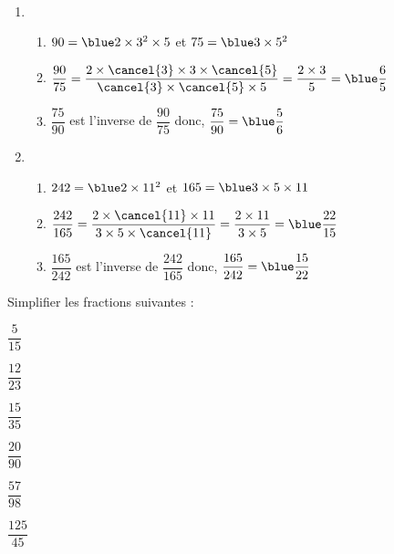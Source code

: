 \begin{colonne*exercice}
\begin{corrige}
\ \\ [-5mm]
   \begin{enumerate}
      \item
         \begin{enumerate}
            \item $90 ={\blue 2\times3^2\times5}$ et $75 ={\blue 3\times5^2}$ \smallskip
            \item $\dfrac{90}{75} =\dfrac{2\times\cancel{3}\times3\times\cancel{5}}{\cancel{3}\times\cancel{5}\times5} =\dfrac{2\times3}{5} ={\blue \dfrac65}$ \smallskip
            \item $\dfrac{75}{90}$ est l'inverse de $\dfrac{90}{75}$ donc, $\dfrac{75}{90}={\blue \dfrac56}$ \smallskip
         \end{enumerate}
      \setcounter{enumi}{1}
      \item          
         \begin{enumerate}
            \item $242 =\blue 2\times11^2$ et $165 =\blue3\times5\times11$ \smallskip
            \item $\dfrac{242}{165} =\dfrac{2\times\cancel{11}\times11}{3\times5\times\cancel{11}} =\dfrac{2\times11}{3\times5} ={\blue \dfrac{22}{15}}$ \smallskip
            \item $\dfrac{165}{242}$ est l'inverse de $\dfrac{242}{165}$ donc, $\dfrac{165}{242} ={\blue \dfrac{15}{22}}$
         \end{enumerate}
   \end{enumerate}
\end{corrige}

\bigskip


\begin{exercice} %
   Simplifier les fractions suivantes : \smallskip
   \begin{colenumerate}{3}
      \item $\dfrac{5}{15}$ \medskip
      \item $\dfrac{12}{23}$ \medskip
      \item $\dfrac{15}{35}$ 
      \item $\dfrac{20}{90}$
      \item $\dfrac{57}{98}$
      \item $\dfrac{125}{45}$      
   \end{colenumerate}
\end{exercice}


\end{colonne*exercice}
